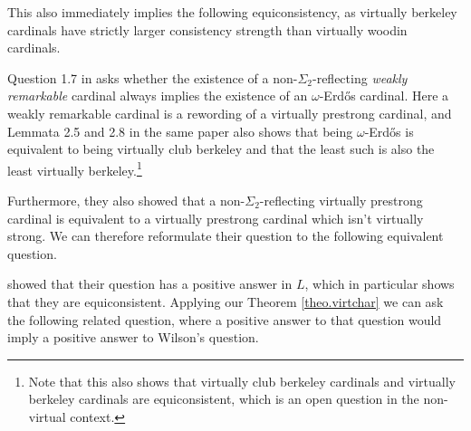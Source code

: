 \documentclass[../main]{subfiles}
\begin{document}

This also immediately implies the following equiconsistency, as virtually berkeley cardinals have strictly larger consistency strength than virtually woodin cardinals.


Question 1.7 in \cite{RemarkableWilson} asks whether the existence of a non-$\Sigma_2$-reflecting \textit{weakly remarkable} cardinal always implies the existence of an $\omega$-Erd\H os cardinal. Here a weakly remarkable cardinal is a rewording of a virtually prestrong cardinal, and Lemmata 2.5 and 2.8 in the same paper also shows that being $\omega$-Erd\H os is equivalent to being virtually club berkeley and that the least such is also the least virtually berkeley.\footnote{Note that this also shows that virtually club berkeley cardinals and virtually berkeley cardinals are equiconsistent, which is an open question in the non-virtual context.}

\qquad Furthermore, they also showed that a non-$\Sigma_2$-reflecting virtually prestrong cardinal is equivalent to a virtually prestrong cardinal which isn't virtually strong. We can therefore reformulate their question to the following equivalent question.


\cite{RemarkableWilson} showed that their question has a positive answer in $L$, which in particular shows that they are equiconsistent. Applying our Theorem \ref{theo.virtchar} we can ask the following related question, where a positive answer to that question would imply a positive answer to Wilson's question.
\end{document}
